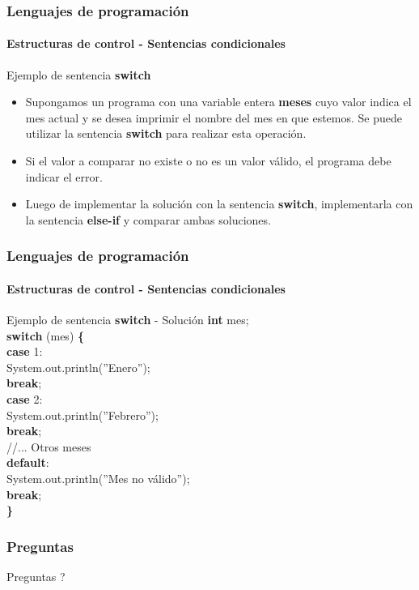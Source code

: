 \documentclass{beamer}
\begin{document}
\begin{frame}
  \frametitle{Lenguajes de programación}
  \framesubtitle{Estructuras de control - Sentencias condicionales}

  \begin{block}{Ejemplo de sentencia \textbf{switch}}
    \begin{itemize}
    \item Supongamos un programa con una variable entera \textbf{meses} cuyo valor indica el mes actual y se desea imprimir el nombre del mes en que estemos. Se puede utilizar la sentencia \textbf{switch} para realizar esta operación.
    \item Si el valor a comparar no existe o no es un valor válido, el programa debe indicar el error.
    \item Luego de implementar la solución con la sentencia \textbf{switch}, implementarla con la sentencia \textbf{else-if} y comparar ambas soluciones. 
    \end{itemize}
  \end{block}
\end{frame}

\begin{frame}
  \frametitle{Lenguajes de programación}
  \framesubtitle{Estructuras de control - Sentencias condicionales}

  \begin{block}{Ejemplo de sentencia \textbf{switch} - Solución}
    {\scriptsize
      \textbf{int} mes;\\
      \vspace{0.3cm}
      \textbf{switch} (mes) \textbf{\{} \\
      \hspace{0.3cm} \textbf{case} 1: \\
      \hspace{0.6cm} System.out.println(''Enero''); \\
      \hspace{0.6cm} \textbf{break}; \\
      \hspace{0.3cm} \textbf{case} 2: \\
      \hspace{0.6cm} System.out.println(''Febrero''); \\
      \hspace{0.6cm} \textbf{break}; \\
      \hspace{0.3cm} //... Otros meses \\
      \hspace{0.3cm} \textbf{default}: \\
      \hspace{0.6cm} System.out.println(''Mes no válido''); \\
      \hspace{0.6cm} \textbf{break}; \\
      \textbf{\}}
    }
  \end{block}
\end{frame}

\begin{frame}
  \frametitle{Preguntas}
  \hspace{4cm}\huge{Preguntas ?}  
\end{frame}
\end{document}
